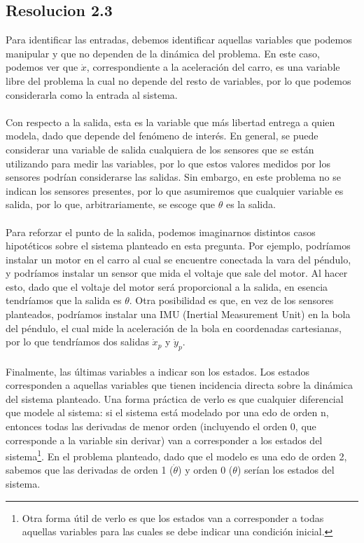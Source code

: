 \documentclass[
  11pt,
  letterpaper,
   addpoints,
   answers
  ]{exam}
\begin{document}
\begin{questions}
\begin{solution}
\subsection*{Resolucion 2.3}
Para identificar las entradas, debemos identificar aquellas variables que podemos manipular y que no dependen de la dinámica del problema. En este caso, podemos ver que \(\dot{x}\), correspondiente a la aceleración del carro, es una variable libre del problema la cual no depende del resto de variables, por lo que podemos considerarla como la entrada al sistema.\\\\
Con respecto a la salida, esta es la variable que más libertad entrega a quien modela, dado que depende del fenómeno de interés. En general, se puede considerar una variable de salida cualquiera de los sensores que se están utilizando para medir las variables, por lo que estos valores medidos por los sensores podrían considerarse las salidas. Sin embargo, en este problema no se indican los sensores presentes, por lo que asumiremos que cualquier variable es salida, por lo que, arbitrariamente, se escoge que \(\theta\) es la salida.\\\\
Para reforzar el punto de la salida, podemos imaginarnos distintos casos hipotéticos sobre el sistema planteado en esta pregunta. Por ejemplo, podríamos instalar un motor en el carro al cual se encuentre conectada la vara del péndulo, y podríamos instalar un sensor que mida el voltaje que sale del motor. Al hacer esto, dado que el voltaje del motor será proporcional a la salida, en esencia tendríamos que la salida es \(\theta\). Otra posibilidad es que, en vez de los sensores planteados, podríamos instalar una IMU (Inertial Measurement Unit) en la bola del péndulo, el cual mide la aceleración de la bola en coordenadas cartesianas, por lo que tendríamos dos salidas \(\dot{x}_p\) y \(\dot{y}_p\).\\\\
Finalmente, las últimas variables a indicar son los estados. Los estados corresponden a aquellas variables que tienen incidencia directa sobre la dinámica del sistema planteado. Una forma práctica de verlo es que cualquier diferencial que modele al sistema: si el sistema está modelado por una edo de orden n, entonces todas las derivadas de menor orden (incluyendo el orden 0, que corresponde a la variable sin derivar) van a corresponder a los estados del sistema\footnote{Otra forma útil de verlo es que los estados van a corresponder a todas aquellas variables para las cuales se debe indicar una condición inicial.}. En el problema planteado, dado que el modelo es una edo de orden 2, sabemos que las derivadas de orden 1 (\(\dot{\theta}\)) y orden 0 (\(\theta\)) serían los estados del sistema.

\end{solution}
\end{questions}
\end{document}
